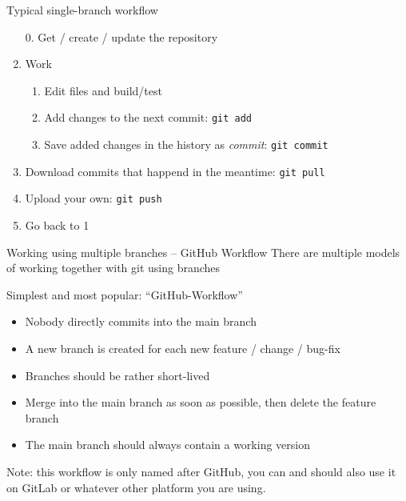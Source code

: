 \begin{frame}{Typical single-branch workflow}
  \begin{enumerate}
    \item[0.] Get / create / update the repository
    \item Work
      \begin{enumerate}
        \item Edit files and build/test
        \item Add changes to the next commit: \texttt{git add}
        \item Save added changes in the history as \emph{commit}: \texttt{git commit}
      \end{enumerate}
    \item Download commits that happend in the meantime: \texttt{git pull}
    \item Upload your own: \texttt{git push}
    \item Go back to 1
  \end{enumerate}
\end{frame}


\begin{frame}[c]{Working using multiple branches – GitHub Workflow}
  There are multiple models of working together with git using branches

  Simplest and most popular: \enquote{GitHub-Workflow}

  \begin{itemize}
    \item Nobody directly commits into the main branch
    \item A new branch is created for each new feature / change / bug-fix
    \item Branches should be rather short-lived
    \item Merge into the main branch as soon as possible, then delete the feature branch
    \item The main branch should always contain a working version
  \end{itemize}


  \bigskip
  \small
  Note: this workflow is only named after GitHub, you can and should also use it on
  GitLab or whatever other platform you are using.
\end{frame}

